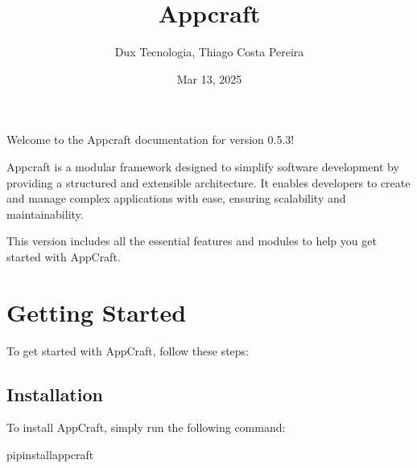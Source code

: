 \documentclass[letterpaper,10pt,english]{sphinxhowto}
\title{Appcraft}
\date{Mar 13, 2025}
\author{Dux Tecnologia, Thiago Costa Pereira}
\let\sphinxpxdimen\pdfpxdimen\else\newdimen\sphinxpxdimen
\begin{document}
\pagestyle{empty}
\sphinxmaketitle
\pagestyle{plain}
\sphinxtableofcontents
\pagestyle{normal}
\label{\detokenize{index::doc}}


\noindent\sphinxincludegraphics[width=200\sphinxpxdimen,height=200\sphinxpxdimen]{{logo}.png}

\sphinxAtStartPar
Welcome to the Appcraft documentation for version 0.5.3!

\sphinxAtStartPar
Appcraft is a modular framework designed to simplify software development by providing a structured and extensible architecture. It enables developers to create and manage complex applications with ease, ensuring scalability and maintainability.

\sphinxAtStartPar
This version includes all the essential features and modules to help you get started with AppCraft.

\sphinxstepscope


\section{Getting Started}
\label{\detokenize{getting_started:getting-started}}\label{\detokenize{getting_started::doc}}
\sphinxAtStartPar
To get started with AppCraft, follow these steps:


\subsection{Installation}
\label{\detokenize{getting_started:installation}}
\sphinxAtStartPar
To install AppCraft, simply run the following command:

\begin{sphinxVerbatim}[commandchars=\\\{\}]
pipinstallappcraft
\end{sphinxVerbatim}
\end{document}
